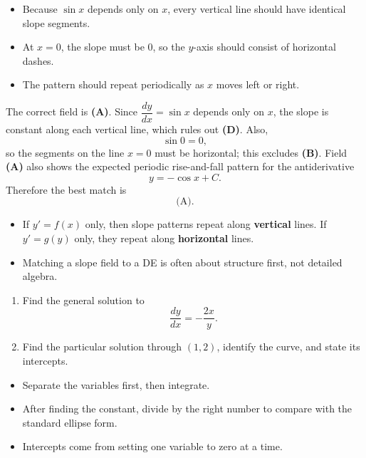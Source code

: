 \begin{hint}
\begin{itemize}[leftmargin=*]
    \item Because $\sin x$ depends only on $x$, every vertical line should have identical slope segments.
    \item At $x=0$, the slope must be $0$, so the $y$-axis should consist of horizontal dashes.
    \item The pattern should repeat periodically as $x$ moves left or right.
\end{itemize}
\end{hint}

\begin{solution}
The correct field is \textbf{(A)}. Since $\dfrac{dy}{dx}=\sin x$ depends only on $x$, the slope is constant along each vertical line, which rules out \textbf{(D)}. Also,
\[
\sin 0=0,
\]
so the segments on the line $x=0$ must be horizontal; this excludes \textbf{(B)}. Field \textbf{(A)} also shows the expected periodic rise-and-fall pattern for the antiderivative
\[
y=-\cos x+C.
\]
Therefore the best match is
\[
\boxed{\text{(A)}}.
\]
\end{solution}

\begin{takeaways}
\begin{itemize}[leftmargin=*]
    \item If $y'=f(x)$ only, then slope patterns repeat along \textbf{vertical} lines. If $y'=g(y)$ only, they repeat along \textbf{horizontal} lines.
    \item Matching a slope field to a DE is often about structure first, not detailed algebra.
\end{itemize}
\end{takeaways}

\begin{problem}
\begin{enumerate}
    \item[\textbf{i}] Find the general solution to
    \[
    \frac{dy}{dx}=-\frac{2x}{y}.
    \]
    \item[\textbf{ii}] Find the particular solution through $(1,2)$, identify the curve, and state its intercepts.
\end{enumerate}
\end{problem}

\begin{hint}
\begin{itemize}[leftmargin=*]
    \item Separate the variables first, then integrate.
    \item After finding the constant, divide by the right number to compare with the standard ellipse form.
    \item Intercepts come from setting one variable to zero at a time.
\end{itemize}
\end{hint}

